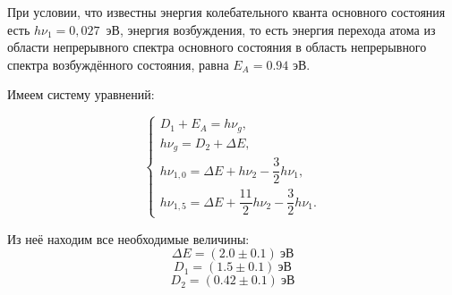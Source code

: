 При условии, что известны энергия колебательного кванта основного
состояния есть $h\nu_1=0,027$~эВ, энергия возбуждения, то есть энергия
перехода атома из области непрерывного спектра основного состояния в
область непрерывного спектра возбуждённого состояния, равна $E_A=0.94$
эВ.\\

\newpage

Имеем систему уравнений:

\begin{equation*}
  \begin{cases}
    D_1+E_A=h \nu_g,                                \\
    h\nu_g=D_2+\Delta E,                            \\
    h\nu_{1,0} =\Delta E+h\nu_2-\dfrac{3}{2}h\nu_1, \\
    h\nu_{1,5}=\Delta E+\dfrac{11}{2}h\nu_2-\dfrac{3}{2}h\nu_1.
  \end{cases}
\end{equation*}

Из неё находим все необходимые величины:
\[ \Delta E=(2.0\pm 0.1) \ \text{эВ} \]
\[  D_1=(1.5\pm 0.1)\  \text{эВ}  \]
\[ D_2=(0.42\pm 0.1) \ \text{эВ} \]